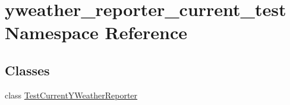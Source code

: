 \hypertarget{namespaceyweather__reporter__current__test}{\section{yweather\-\_\-reporter\-\_\-current\-\_\-test Namespace Reference}
\label{namespaceyweather__reporter__current__test}
}
\subsection*{Classes}
\begin{DoxyCompactItemize}
\item 
class \hyperlink{classyweather__reporter__current__test_1_1TestCurrentYWeatherReporter}{Test\-Current\-Y\-Weather\-Reporter}
\end{DoxyCompactItemize}
